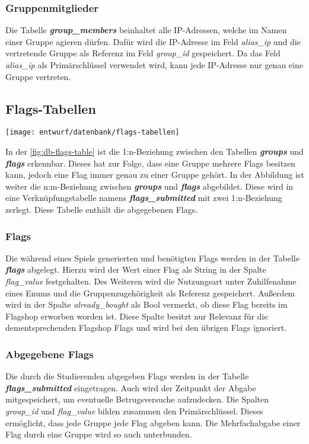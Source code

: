 \subsubsection{Gruppenmitglieder}
Die Tabelle \textbf{\textit{group\_members}} beinhaltet alle IP-Adressen, welche im Namen einer Gruppe agieren dürfen. Dafür wird die IP-Adresse im Feld \textit{alias\_ip} und die vertretende Gruppe als Referenz im Feld \textit{group\_id} gespeichert. Da das Feld \textit{alias\_ip} als Primärschlüssel verwendet wird, kann jede IP-Adresse nur genau eine Gruppe vertreten.

\subsection{Flags-Tabellen}
\begin{center}
	\texttt{[image: entwurf/datenbank/flags-tabellen]}
	\label{fig:db-flags-table}
\end{center}


In der \autoref{fig:db-flags-table} ist die 1:n-Beziehung zwischen den Tabellen \textbf{\textit{groups}} und \textbf{\textit{flags}} erkennbar. Dieses hat zur Folge, dass eine Gruppe mehrere Flags besitzen kann, jedoch eine Flag immer genau zu einer Gruppe gehört. In der Abbildung ist weiter die n:m-Beziehung zwischen \textbf{\textit{groups}} und \textbf{\textit{flags}} abgebildet. Diese wird in eine Verknüpfungstabelle namens \textbf{\textit{flags\_submitted}} mit zwei 1:n-Beziehung zerlegt. Diese Tabelle enthält die abgegebenen Flags.
 
\subsubsection{Flags}
Die während eines Spiels generierten und benötigten Flags werden in der Tabelle \textbf{\textit{flags}} abgelegt. Hierzu wird der Wert einer Flag als String in der Spalte \textit{flag\_value} festgehalten. Des Weiteren wird die Nutzungsart unter Zuhilfenahme eines Enums und die Gruppenzugehörigkeit als Referenz gespeichert. Außerdem wird in der Spalte \textit{already\_bought} als Bool vermerkt, ob diese Flag bereits im Flagshop erworben worden ist. Diese Spalte besitzt nur Relevanz für die dementsprechenden Flagshop Flags und wird bei den übrigen Flags ignoriert.

\subsubsection{Abgegebene Flags}
Die durch die Studierenden abgegeben Flags werden in der Tabelle \textbf{\textit{flags\_submitted}} eingetragen. Auch wird der Zeitpunkt der Abgabe mitgespeichert, um eventuelle Betrugsversuche aufzudecken. Die Spalten \textit{group\_id} und \textit{flag\_value} bilden zusammen den Primärschlüssel. Dieses ermöglicht, dass jede Gruppe jede Flag abgeben kann. Die Mehrfachabgabe einer Flag durch eine Gruppe wird so auch unterbunden.

